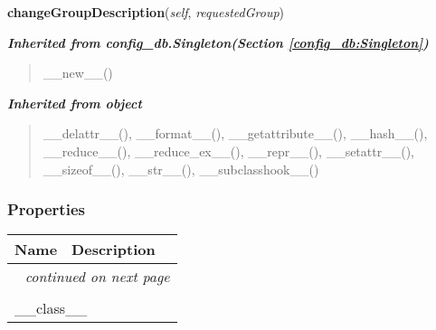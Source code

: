 \hspace{.8\funcindent}\begin{boxedminipage}{\funcwidth}

    \raggedright \textbf{changeGroupDescription}(\textit{self}, \textit{requestedGroup})

\setlength{\parskip}{2ex}
\setlength{\parskip}{1ex}
    \end{boxedminipage}


\large{\textbf{\textit{Inherited from config\_db.Singleton\textit{(Section \ref{config_db:Singleton})}}}}

\begin{quote}
\_\_new\_\_()
\end{quote}

\large{\textbf{\textit{Inherited from object}}}

\begin{quote}
\_\_delattr\_\_(), \_\_format\_\_(), \_\_getattribute\_\_(), \_\_hash\_\_(), \_\_reduce\_\_(), \_\_reduce\_ex\_\_(), \_\_repr\_\_(), \_\_setattr\_\_(), \_\_sizeof\_\_(), \_\_str\_\_(), \_\_subclasshook\_\_()
\end{quote}


  \subsubsection{Properties}

    \vspace{-1cm}
\hspace{\varindent}\begin{longtable}{|p{\varnamewidth}|p{\vardescrwidth}|l}
\cline{1-2}
\cline{1-2} \centering \textbf{Name} & \centering \textbf{Description}& \\
\cline{1-2}
\endhead\cline{1-2}\multicolumn{3}{r}{\small\textit{continued on next page}}\\\endfoot\cline{1-2}
\endlastfoot\multicolumn{2}{|l|}{\textit{Inherited from object}}\\
\multicolumn{2}{|p{\varwidth}|}{\raggedright \_\_class\_\_}\\
\cline{1-2}
\end{longtable}



